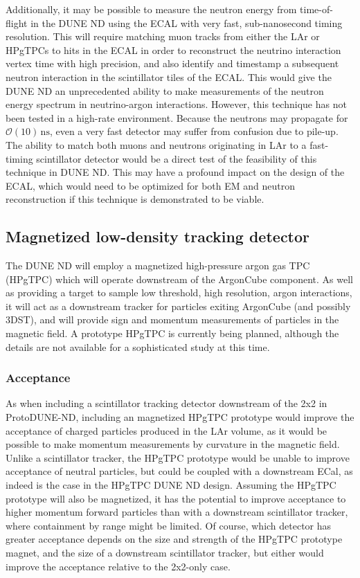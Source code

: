 Additionally, it may be possible to measure the neutron energy from time-of-flight in the DUNE ND using the ECAL with very fast, sub-nanosecond timing resolution. This will require matching muon tracks from either the LAr or HPgTPCs to hits in the ECAL in order to reconstruct the neutrino interaction vertex time with high precision, and also identify and timestamp a subsequent neutron interaction in the scintillator tiles of the ECAL. This would give the DUNE ND an unprecedented ability to make measurements of the neutron energy spectrum in neutrino-argon interactions. However, this technique has not been tested in a high-rate environment. Because the neutrons may propagate for $\mathcal{O}\left(10\right)\,\mathrm{ns}$, even a very fast detector may suffer from confusion due to pile-up. The ability to match both muons and neutrons originating in LAr to a fast-timing scintillator detector would be a direct test of the feasibility of this technique in DUNE ND. This may have a profound impact on the design of the ECAL, which would need to be optimized for both EM and neutron reconstruction if this technique is demonstrated to be viable.
 
\subsection{Magnetized low-density tracking detector}
The DUNE ND will employ a magnetized high-pressure argon gas TPC (HPgTPC) which will operate downstream of the ArgonCube component. As well as providing a target to sample low threshold, high resolution, argon interactions, it will act as a downstream tracker for particles exiting ArgonCube (and possibly 3DST), and will provide sign and momentum measurements of particles in the magnetic field. A prototype HPgTPC is currently being planned, although the details are not available for a sophisticated study at this time.

\subsubsection{Acceptance}
As when including a scintillator tracking detector downstream of the 2x2 in ProtoDUNE-ND, including an magnetized HPgTPC prototype would improve the acceptance of charged particles produced in the LAr volume, as it would be possible to make momentum measurements by curvature in the magnetic field. Unlike a scintillator tracker, the HPgTPC prototype would be unable to improve acceptance of neutral particles, but could be coupled with a downstream ECal, as indeed is the case in the HPgTPC DUNE ND design. Assuming the HPgTPC prototype will also be magnetized, it has the potential to improve acceptance to higher momentum forward particles than with a downstream scintillator tracker, where containment by range might be limited. Of course, which detector has greater acceptance depends on the size and strength of the HPgTPC prototype magnet, and the size of a downstream scintillator tracker, but either would improve the acceptance relative to the 2x2-only case.

